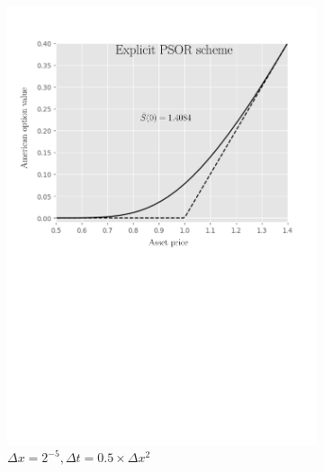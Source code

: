 \begin{figure}[tbp]
\begin{subfigure}{0.4\textwidth}
    \includegraphics[width=\textwidth]{chapters/chapter5/TestCase3ExplicitLCP.pdf}
    \caption{$\Delta{x}=2^{-5}, \Delta{t}=0.5\times\Delta{x}^2$}
    \label{fig:lcp:numericaresults:test_case_3_explicit}
  \end{subfigure}
  \begin{subfigure}{0.4\textwidth}
    \centering

\end{subfigure}
\end{figure}
